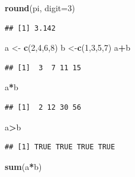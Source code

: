 \documentclass[
]{article}
\newenvironment{Shaded}{\begin{snugshade}}{\end{snugshade}}
\newcommand{\AttributeTok}[1]{\textcolor[rgb]{0.13,0.29,0.53}{#1}}
\newcommand{\DecValTok}[1]{\textcolor[rgb]{0.00,0.00,0.81}{#1}}
\newcommand{\FunctionTok}[1]{\textcolor[rgb]{0.13,0.29,0.53}{\textbf{#1}}}
\newcommand{\NormalTok}[1]{#1}
\newcommand{\OtherTok}[1]{\textcolor[rgb]{0.56,0.35,0.01}{#1}}
\newcommand{\SpecialCharTok}[1]{\textcolor[rgb]{0.81,0.36,0.00}{\textbf{#1}}}
\begin{document}
\begin{Shaded}
\begin{Highlighting}[]
\FunctionTok{round}\NormalTok{(pi, }\AttributeTok{digit=}\DecValTok{3}\NormalTok{)}
\end{Highlighting}
\end{Shaded}

\begin{verbatim}
## [1] 3.142
\end{verbatim}

\begin{Shaded}
\begin{Highlighting}[]
\NormalTok{a }\OtherTok{\textless{}{-}} \FunctionTok{c}\NormalTok{(}\DecValTok{2}\NormalTok{,}\DecValTok{4}\NormalTok{,}\DecValTok{6}\NormalTok{,}\DecValTok{8}\NormalTok{)}
\NormalTok{b }\OtherTok{\textless{}{-}}\FunctionTok{c}\NormalTok{(}\DecValTok{1}\NormalTok{,}\DecValTok{3}\NormalTok{,}\DecValTok{5}\NormalTok{,}\DecValTok{7}\NormalTok{)}
\NormalTok{a}\SpecialCharTok{+}\NormalTok{b}
\end{Highlighting}
\end{Shaded}

\begin{verbatim}
## [1]  3  7 11 15
\end{verbatim}

\begin{Shaded}
\begin{Highlighting}[]
\NormalTok{a}\SpecialCharTok{*}\NormalTok{b}
\end{Highlighting}
\end{Shaded}

\begin{verbatim}
## [1]  2 12 30 56
\end{verbatim}

\begin{Shaded}
\begin{Highlighting}[]
\NormalTok{a}\SpecialCharTok{\textgreater{}}\NormalTok{b}
\end{Highlighting}
\end{Shaded}

\begin{verbatim}
## [1] TRUE TRUE TRUE TRUE
\end{verbatim}

\begin{Shaded}
\begin{Highlighting}[]
\FunctionTok{sum}\NormalTok{(a}\SpecialCharTok{*}\NormalTok{b)}
\end{Highlighting}
\end{Shaded}
\end{document}
